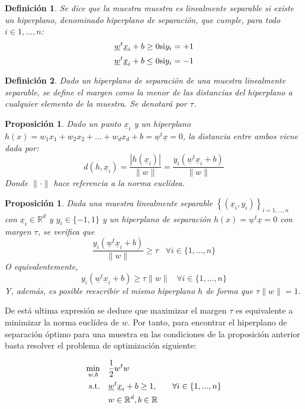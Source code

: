 \documentclass[12pt,a4paper,]{book}
\newcounter{dummy}
\numberwithin{dummy}{section}
\theoremstyle{ocrenumbox}
\theoremstyle{blacknumex}
\theoremstyle{blacknumbox}
\newtheorem{definitionT}{Definición}[section]  %
\theoremstyle{ocrenum}
\newtheorem{proposition}[dummy]{Proposición} %
\newenvironment{definition}{\begin{dBox}\begin{definitionT}}{\end{definitionT}\end{dBox}}
\theoremstyle{ocrenum}
\begin{document}
\begin{definition}
Se dice que la muestra muestra es linealmente separable si existe un hiperplano, denominado hiperplano de separación, que cumple, para todo $i \in 1,...,n$:
$$\underline w^t \underline x_i + b \ge 0 \space \space \text{si} \space \space y_i=+1$$
$$\underline w^t \underline x_i + b \le 0 \space \space \text{si} \space \space y_i=-1$$
\end{definition}

\begin{definition}
Dado un hiperplano de separación de una muestra linealmente separable, se define el margen como la menor de las distancias del hiperplano a cualquier elemento de la muestra. Se denotará por $\tau$.
\end{definition}

\begin{proposition}
Dado un punto $\underline x_i$ y un hiperplano $h(x) = w_1x_1 +w_2x_2+...+w_dx_d +b = \underline w^t \underline x = 0$, la distancia entre ambos viene dada por:
$$d(h,\underline x_i) = \frac{|h(\underline x_i)|}{\|w\|} = \frac{y_i(\underline w^t \underline x_i+b)}{\|w\|}$$
Donde $\|\cdot\|$ hace referencia a la norma euclídea.
\end{proposition}

\begin{proposition}
Dada una muestra linealmente separable $\left\{(\underline x_i,y_i) \right\}_{i=1,...,n}$ con $\underline x_i \in \mathbb{R}^d$ y $y_i \in \{-1,1\}$ y un hiperplano de separación $h(x) = \underline w^t \underline x = 0$ con margen $\tau$, se verifica que
$$\frac{y_i(\underline w^t \underline x_i+b)}{\|w\|} \ge \tau \;\;\; \forall i\in \{1,...,n\}$$
O equivalentemente,
$$y_i(\underline w^t \underline x_i+b) \ge \tau\|w\| \;\;\; \forall i\in \{1,...,n\}$$
Y, además, es posible reescribir el mismo hiperplano $h$ de forma que $\tau\|w\| = 1$.
\end{proposition}

De está ultima expresión se deduce que maximizar el margen \(\tau\) es
equivalente a minimizar la norma euclídea de \(w\). Por tanto, para
encontrar el hiperplano de separación óptimo para una muestra en las
condiciones de la proposición anterior basta resolver el problema de
optimización siguiente:

\begin{equation}
\begin{aligned}
\min_{w,b} \quad & \frac{1}{2}w^{t}w\\
\textrm{s.t.} \quad & \underline w^t \underline x_i+b \ge 1, \quad & \forall i\in \{1,...,n\} \\
  & w \in \mathbb{R}^d, \space b \in \mathbb{R} \\ 
\end{aligned}
\end{equation}
\end{document}
